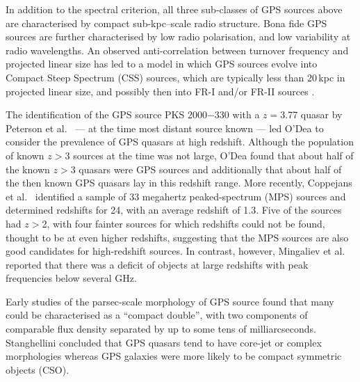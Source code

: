 \documentclass{pasa}%
\begin{document}
In addition to the spectral criterion,
all three sub-classes of
GPS sources above are characterised
by compact sub-kpc--scale radio structure.
Bona fide GPS sources are further characterised by 
low radio polarisation, and
low variability at radio wavelengths.
An observed anti-correlation
between turnover frequency and projected linear size
\cite{fan90,ode97} has led to a model in which GPS sources evolve into
Compact Steep Spectrum (CSS) sources, which are typically less than
20\,kpc in projected linear size, and possibly then into FR-I and/or
FR-II sources \cite{sne03,tied15}.

The identification of the GPS source PKS 2000$-$330 with a $z=$3.77
quasar by Peterson et al.\  --- at the time most
distant source known --- led O'Dea  to consider the
prevalence of GPS quasars at high redshift.  Although the population
of known $z>$3 sources at the time was not large, O'Dea found that
about half of the known $z>$3 quasars were GPS sources and
additionally that about half of the then known GPS quasars lay in this
redshift range.  More recently, Coppejans et al.\ 
identified a sample of 33 megahertz peaked-spectrum (MPS) sources and
determined redshifts for 24, with an average redshift of 1.3.  Five of
the sources had $z>$2, with four fainter sources for which redshifts
could not be found, thought to be at even higher redshifts, suggesting
that the MPS sources are also good candidates for high-redshift
sources.  In contrast, however, Mingaliev et al.\ 
reported that there was a deficit of objects at large redshifts with
peak frequencies below several GHz.

Early studies of the parsec-scale morphology of GPS source found that
many could be characterised as a ``compact double'', with two
components of comparable flux density separated by up to some tens of
milliarcseconds.  Stanghellini  concluded that GPS
quasars tend to have core-jet or complex morphologies whereas GPS
galaxies were more likely to be compact symmetric objects (CSO).
\end{document}
